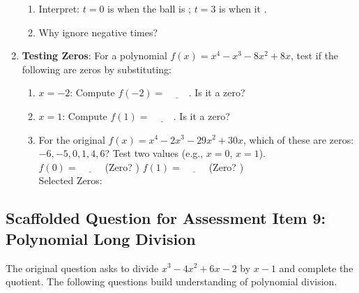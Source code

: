 \documentclass[12pt]{article}
\begin{document}
\begin{enumerate}[label=5.\arabic*]
\begin{enumerate}[label=\alph*)]
        \item Interpret: \( t = 0 \) is when the ball is \underline{\hspace{2cm}}; \( t = 3 \) is when it \underline{\hspace{2cm}}.
        \item Why ignore negative times? \underline{\hspace{6cm}}
    \end{enumerate}
    \item \textbf{Testing Zeros}: For a polynomial \( f(x) = x^4 - x^3 - 8x^2 + 8x \), test if the following are zeros by substituting:
    \begin{enumerate}[label=\alph*)]
        \item \( x = -2 \): Compute \( f(-2) = \underline{\hspace{1cm}} \). Is it a zero? \underline{\hspace{1cm}}
        \item \( x = 1 \): Compute \( f(1) = \underline{\hspace{1cm}} \). Is it a zero? \underline{\hspace{1cm}}
        \item For the original \( f(x) = x^4 - 2x^3 - 29x^2 + 30x \), which of these are zeros: \( -6, -5, 0, 1, 4, 6 \)? Test two values (e.g., \( x = 0 \), \( x = 1 \)).
            \\ \(f(0) = \underline{\hspace{1cm}}\) (Zero? \underline{\hspace{0.5cm}}) \quad \(f(1) = \underline{\hspace{1cm}}\) (Zero? \underline{\hspace{0.5cm}})
            \\ Selected Zeros: \underline{\hspace{5cm}}
    \end{enumerate}
\end{enumerate}

\subsection*{Scaffolded Question for Assessment Item 9: Polynomial Long Division}
The original question asks to divide \( x^3 - 4x^2 + 6x - 2 \) by \( x - 1 \) and complete the quotient. The following questions build understanding of polynomial division.
\end{document}
